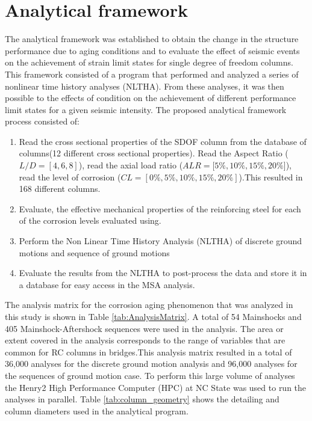 \section{Analytical framework}

The analytical framework was  established to obtain the change in the structure performance   due to aging conditions and to evaluate the effect of seismic events  on the achievement of strain limit states for  single degree of freedom columns. This framework consisted of a program that performed  and analyzed a series of nonlinear time history analyses (NLTHA). From these analyses, it was then possible to the effects of condition on the achievement of different performance limit states for a given seismic intensity. The proposed analytical framework process consisted of:

\begin{enumerate}
	\item Read the cross sectional properties of the SDOF column from the database of columns(12 different cross sectional properties). Read the Aspect Ratio ($L/D=[4,6,8]$), read the axial load ratio ($ALR=[5\%,10\%,15\%,20\%$]), read the level of corrosion ($CL=[0\%,5\%,10\%,15\%,20\%]$).This resulted in 168 different columns.
	\item Evaluate, the effective mechanical properties of the reinforcing steel for each of the corrosion levels evaluated using.
	\item Perform the Non Linear Time History Analysis (NLTHA) of discrete ground motions and sequence of ground motions
	\item Evaluate the results from the NLTHA to post-process the data and store it in a database for easy access in the MSA analysis.
\end{enumerate}

The analysis matrix for the corrosion aging phenomenon that was analyzed in this study is shown in Table \ref{tab:AnalysisMatrix}. A total of 54 Mainshocks and 405 Mainshock-Aftershock sequences were used in the analysis. The area or extent covered in the analysis corresponds to the range of variables that are common for RC columns in bridges.This analysis matrix resulted in a total of 36,000 analyses for the discrete ground motion analysis and 96,000 analyses for the sequences of ground motion case. To perform this large volume of analyses the Henry2 High Performance Computer (HPC) at NC State was used to run the analyses in parallel. Table \ref{tab:column_geometry} shows the detailing and column diameters used in the analytical program.


